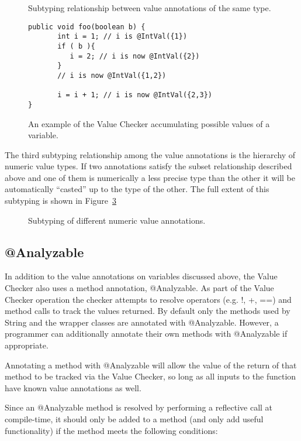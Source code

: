 \begin{figure}
\caption{Subtyping relationship between value annotations of the same type.}
\label{fig-value-subtype}
\end{figure}

\begin{figure}
\begin{Verbatim}
public void foo(boolean b) {
       int i = 1; // i is @IntVal({1})
       if ( b ){  
          i = 2; // i is now @IntVal({2})
       }        
       // i is now @IntVal({1,2})
       
       i = i + 1; // i is now @IntVal({2,3})
}
\end{Verbatim}
\caption{An example of the Value Checker accumulating possible values
    of a variable.}
\label{fig-regex-partial}
\end{figure}

The third subtyping relationship among the value annotations is the
hierarchy of numeric value types. If two annotations satisfy the
subset relationship described above and one of them is numerically a
less precise type than the other it will be automatically ``casted''
up to the type of the other. The full extent of this subtyping is
shown in Figure~\ref{fig-value-subtyping}

\begin{figure}
\caption{Subtyping of different numeric value annotations.}
\label{fig-value-subtyping}
\end{figure}

\subsection{@Analyzable}
In addition to the value annotations on variables discussed above,
the Value Checker also uses a method annotation,
@Analyzable. As part of the Value Checker operation the checker
attempts to resolve operators (e.g. !, +, ==) and method calls to
track the values returned. By default only the methods used by String
and the wrapper classes are annotated with @Analyzable. However, a
programmer can additionally annotate their own methods with
@Analyzable if appropriate.

Annotating a method with @Analyzable will allow the value of the
return of that method to be tracked via the Value Checker, so long as
all inputs to the function have known value annotations as well.

Since an @Analyzable method is resolved by performing a reflective
call at compile-time, it should only be added to a method (and only
add useful functionality) if the method meets the following
conditions:

